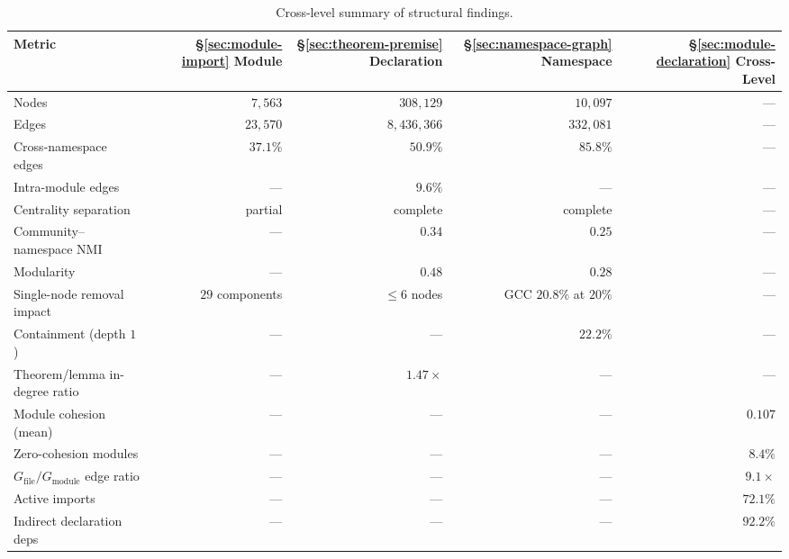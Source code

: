 \begin{table}[ht]
\centering
\caption{Cross-level summary of structural findings.}
\label{tab:summary}
\small
\begin{tabular}{lrrrr}
\toprule
Metric & \S\ref{sec:module-import} Module & \S\ref{sec:theorem-premise} Declaration & \S\ref{sec:namespace-graph} Namespace & \S\ref{sec:module-declaration} Cross-Level \\
\midrule
Nodes                      & $7{,}563$        & $308{,}129$      & $10{,}097$       & --- \\
Edges                      & $23{,}570$       & $8{,}436{,}366$  & $332{,}081$      & --- \\
Cross-namespace edges       & $37.1\%$         & $50.9\%$         & $85.8\%$         & --- \\
Intra-module edges          & ---              & $9.6\%$          & ---              & --- \\
Centrality separation       & partial          & complete         & complete         & --- \\
Community--namespace NMI   & ---              & $0.34$           & $0.25$           & --- \\
Modularity                 & ---              & $0.48$           & $0.28$           & --- \\
Single-node removal impact & $29$ components  & $\le 6$ nodes    & GCC $20.8\%$ at $20\%$ & --- \\
Containment (depth $1$)    & ---              & ---              & $22.2\%$         & --- \\
Theorem/lemma in-degree ratio & ---            & $1.47\times$     & ---              & --- \\
Module cohesion (mean)     & ---              & ---              & ---              & $0.107$ \\
Zero-cohesion modules      & ---              & ---              & ---              & $8.4\%$ \\
$G_{\mathrm{file}}/G_{\mathrm{module}}$ edge ratio & ---  & ---  & ---              & $9.1\times$ \\
Active imports             & ---              & ---              & ---              & $72.1\%$ \\
Indirect declaration deps  & ---              & ---              & ---              & $92.2\%$ \\
\bottomrule
\end{tabular}
\end{table}

